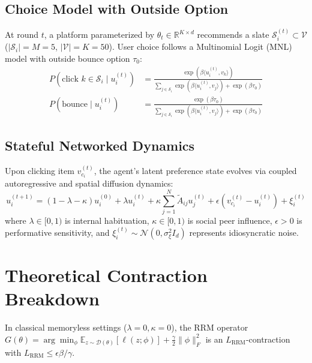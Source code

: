 \documentclass[10pt,twocolumn]{article}
\begin{document}
\subsection{Choice Model with Outside Option}
At round $t$, a platform parameterized by $\theta_t \in \mathbb{R}^{K \times d}$ recommends a slate $\mathcal{S}_i^{(t)} \subset \mathcal{V}$ ($|\mathcal{S}_i|=M=5$, $|\mathcal{V}|=K=50$). User choice follows a Multinomial Logit (MNL) model with outside bounce option $\tau_0$:
\begin{align}
P(\text{click } k \in \mathcal{S}_i \mid u_i^{(t)}) &= \frac{\exp(\beta \langle u_i^{(t)}, v_k \rangle)}{\sum_{j \in \mathcal{S}_i} \exp(\beta \langle u_i^{(t)}, v_j \rangle) + \exp(\beta \tau_0)} \\
P(\text{bounce} \mid u_i^{(t)}) &= \frac{\exp(\beta \tau_0)}{\sum_{j \in \mathcal{S}_i} \exp(\beta \langle u_i^{(t)}, v_j \rangle) + \exp(\beta \tau_0)}
\end{align}

\subsection{Stateful Networked Dynamics}
Upon clicking item $v_{c_i}^{(t)}$, the agent's latent preference state evolves via coupled autoregressive and spatial diffusion dynamics:
\begin{equation}
\label{eq:dynamics}
u_i^{(t+1)} = (1 - \lambda - \kappa) u_i^{(0)} + \lambda u_i^{(t)} + \kappa \sum_{j=1}^N \tilde{A}_{ij} u_j^{(t)} + \epsilon (v_{c_i}^{(t)} - u_i^{(t)}) + \xi_i^{(t)}
\end{equation}
where $\lambda \in [0, 1)$ is internal habituation, $\kappa \in [0, 1)$ is social peer influence, $\epsilon > 0$ is performative sensitivity, and $\xi_i^{(t)} \sim \mathcal{N}(0, \sigma_\xi^2 I_d)$ represents idiosyncratic noise.

\section{Theoretical Contraction Breakdown}

In classical memoryless settings ($\lambda = 0, \kappa = 0$), the RRM operator $G(\theta) = \arg\min_\phi \mathbb{E}_{z \sim \mathcal{D}(\theta)}[\ell(z; \phi)] + \frac{\gamma}{2}\|\phi\|_F^2$ is an $L_{\text{RRM}}$-contraction with $L_{\text{RRM}} \le \epsilon \beta / \gamma$.
\end{document}
